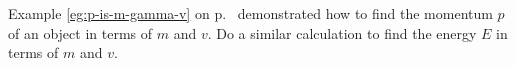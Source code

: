Example \ref{eg:p-is-m-gamma-v} on p.~\pageref{eg:p-is-m-gamma-v} demonstrated
how to find the momentum $p$ of an object in terms of $m$ and $v$. Do a similar
calculation to find the energy $E$ in terms of $m$ and $v$.\answercheck
